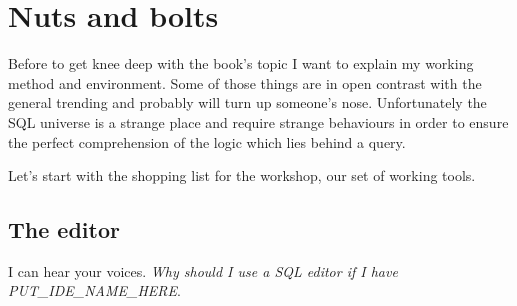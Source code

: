 \chapter{Nuts and bolts}
Before to get knee deep with the book's topic I want to explain my working method and environment.
Some of those things are in open contrast with the general trending and probably will turn up
someone's nose. Unfortunately the SQL universe is a strange place and require strange behaviours
in order to ensure the perfect comprehension of the logic which lies behind a query.\newline

Let's start with the shopping list for the workshop, our set of working tools.

\section{The editor}
I can hear your voices. \textit{Why should I use a SQL editor if I have PUT\_IDE\_NAME\_HERE}. 